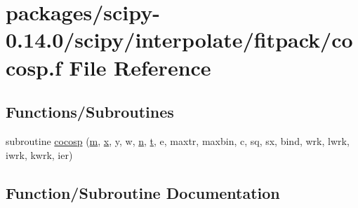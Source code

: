 \hypertarget{cocosp_8f}{}\section{packages/scipy-\/0.14.0/scipy/interpolate/fitpack/cocosp.f File Reference}
\label{cocosp_8f}
\subsection*{Functions/\+Subroutines}
\begin{DoxyCompactItemize}
\item 
subroutine \hyperlink{cocosp_8f_aa09172f3e9c36d2831b0a3e670b486d4}{cocosp} (\hyperlink{indexexpr_8h_ab72fdb4031d47b75ab26dd18a437bcdc}{m}, \hyperlink{vecnorm1_8cc_ac73eed9e41ec09d58f112f06c2d6cb63}{x}, y, w, \hyperlink{indexexpr_8h_ab427e2e2b4d6cec55fa088ea2a692ace}{n}, \hyperlink{indexexpr_8h_a01709998b82be3f34e0412206618d09d}{t}, e, maxtr, maxbin, c, sq, sx, bind, wrk, lwrk, iwrk, kwrk, ier)
\end{DoxyCompactItemize}


\subsection{Function/\+Subroutine Documentation}
\hypertarget{cocosp_8f_aa09172f3e9c36d2831b0a3e670b486d4}{}
